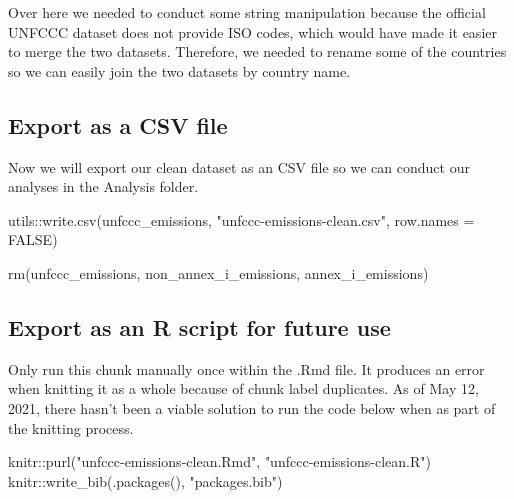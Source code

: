 \documentclass[
  12pt,
]{article}
\newenvironment{Shaded}{}{}
\newcommand{\AttributeTok}[1]{\textcolor[rgb]{0.49,0.56,0.16}{#1}}
\newcommand{\ConstantTok}[1]{\textcolor[rgb]{0.53,0.00,0.00}{#1}}
\newcommand{\FunctionTok}[1]{\textcolor[rgb]{0.02,0.16,0.49}{#1}}
\newcommand{\NormalTok}[1]{#1}
\newcommand{\SpecialCharTok}[1]{\textcolor[rgb]{0.25,0.44,0.63}{#1}}
\newcommand{\StringTok}[1]{\textcolor[rgb]{0.25,0.44,0.63}{#1}}
\begin{document}
Over here we needed to conduct some string manipulation because the
official UNFCCC dataset does not provide ISO codes, which would have
made it easier to merge the two datasets. Therefore, we needed to rename
some of the countries so we can easily join the two datasets by country
name.

\hypertarget{export-as-a-csv-file}{%
\subsection{Export as a CSV file}\label{export-as-a-csv-file}}

Now we will export our clean dataset as an CSV file so we can conduct
our analyses in the Analysis folder.

\begin{Shaded}
\begin{Highlighting}[]
\NormalTok{utils}\SpecialCharTok{::}\FunctionTok{write.csv}\NormalTok{(unfccc\_emissions, }\StringTok{"unfccc{-}emissions{-}clean.csv"}\NormalTok{, }
    \AttributeTok{row.names =} \ConstantTok{FALSE}\NormalTok{)}

\FunctionTok{rm}\NormalTok{(unfccc\_emissions, non\_annex\_i\_emissions, }
\NormalTok{    annex\_i\_emissions)}
\end{Highlighting}
\end{Shaded}

\hypertarget{export-as-an-r-script-for-future-use}{%
\subsection{Export as an R script for future
use}\label{export-as-an-r-script-for-future-use}}

Only run this chunk manually once within the .Rmd file. It produces an
error when knitting it as a whole because of chunk label duplicates. As
of May 12, 2021, there hasn't been a viable solution to run the code
below when as part of the knitting process.

\begin{Shaded}
\begin{Highlighting}[]
\NormalTok{knitr}\SpecialCharTok{::}\FunctionTok{purl}\NormalTok{(}\StringTok{"unfccc{-}emissions{-}clean.Rmd"}\NormalTok{, }
    \StringTok{"unfccc{-}emissions{-}clean.R"}\NormalTok{)}
\NormalTok{knitr}\SpecialCharTok{::}\FunctionTok{write\_bib}\NormalTok{(}\FunctionTok{.packages}\NormalTok{(), }\StringTok{"packages.bib"}\NormalTok{)}
\end{Highlighting}
\end{Shaded}
\end{document}
